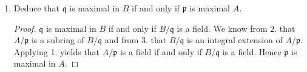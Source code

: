 \documentclass[a4paper]{article}
\begin{document}
\begin{enumerate}
\begin{proof}
\begin{align*}
      &(b + \mathfrak{q})^n + (a_{n-1} + \mathfrak{q}) (b + \mathfrak{q})^{n-1} + \cdots + (a_0 + \mathfrak{q}) \\
      =& (b^n + \mathfrak{q}) + (a_{n-1}b^{n-1} + \mathfrak{q}) + \cdots + (a_0 + \mathfrak{q}) \\
      =& b^n + a_{n-1}b^{n-1} + \cdots + a_0 + \mathfrak{q} \\
      =& 0 + \mathfrak{q} \text{,}
    \end{align*}
    so \(B/\mathfrak{q}\) is integral over \(A / \mathfrak{p}\).
  \end{proof}
  \item Deduce that \(\mathfrak{q}\) is maximal in \(B\) if and only if \(\mathfrak{p}\) is maximal \(A\).
  \begin{proof}
    \(\mathfrak{q}\) is maximal in \(B\) if and only if \(B/\mathfrak{q}\) is a field. We know from 2. that \(A/\mathfrak{p}\) is a subring of \(B/\mathfrak{q}\) and from 3. that \(B/\mathfrak{q}\) is an integral extension of \(A/\mathfrak{p}\). Applying 1. yields that \(A/\mathfrak{p}\) is a field if and only if \(B/\mathfrak{q}\) is a field. Hence \(\mathfrak{p}\) is maximal in \(A\).
  \end{proof}
\end{enumerate}
\newpage
\end{document}
